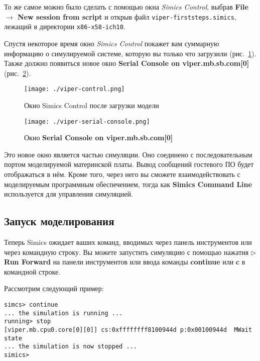 То же самое можно было сделать с помощью окна \textit{Simics Control}, выбрав \textbf{File $\to$ New session from script} и открыв файл \texttt{viper-firststeps.simics}, лежащий в директории \texttt{x86-x58-ich10}.

Спустя некоторое время окно \textit{Simics Control} покажет вам суммарную информацию о симулируемой системе, которую вы только что загрузили (рис.~\ref{fig:viper-control}). Также должно появиться новое окно \textbf{Serial Console on viper.mb.sb.com[0]} (рис.~\ref{fig:viper-serial-console}).

\begin{figure}[ht]
    \centering
    \texttt{[image: ./viper-control.png]}
    \caption{Окно Simics Control после загрузки модели}
    \label{fig:viper-control}
\end{figure}

\begin{figure}[ht]
    \centering
    \texttt{[image: ./viper-serial-console.png]}
    \caption[Окно Serial Console]{Окно \textbf{Serial Console on viper.mb.sb.com[0]}}
    \label{fig:viper-serial-console}
\end{figure}

Это новое окно является частью симуляции. Оно соединено с последовательным портом моделируемой материнской платы. Вывод сообщений гостевого ПО будет отображаться в нём. Кроме того, через него вы сможете взаимодействовать с моделируемым программным обеспечением, тогда как \textbf{Simics Command Line} используется для управления симуляцией.

\subsection{Запуск моделирования}

Теперь Simics ожидает ваших команд, вводимых через панель инструментов или через командную строку. Вы можете запустить симуляцию с помощью нажатия $\triangleright$ \textbf{Run Forward} на панели инструментов или ввода команды \textbf{continue} или \textbf{c} в командной строке.

Рассмотрим следующий пример:

\begin{lstlisting}
simcs> continue
... the simulation is running ...
running> stop
[viper.mb.cpu0.core[0][0]] cs:0xffffffff8100944d p:0x00100944d  MWait state
... the simulation is now stopped ...
simics>
\end{lstlisting}

